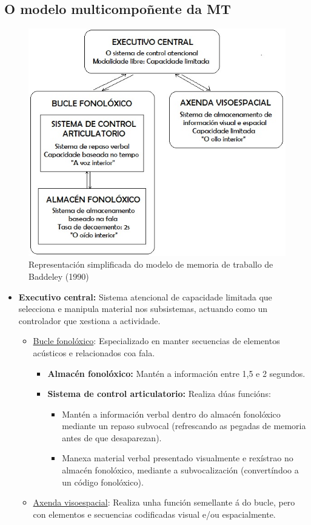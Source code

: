 \documentclass[a4paper,11pt]{article}
\begin{document}
\subsection{O modelo multicompoñente da MT}
\begin{figure}[h!]
	\centering
	\includegraphics[width=0.6\linewidth]{memoria2_4}
	\caption{Representación simplificada do modelo de memoria de traballo de Baddeley (1990)}
\end{figure}

\begin{itemize}
	\item \textbf{Executivo central:} Sistema atencional de capacidade limitada que selecciona e
	manipula material nos subsistemas, actuando como un controlador que xestiona a actividade.
	\begin{itemize}
		\item \underline{Bucle fonolóxico}: Especializado en manter secuencias de elementos acústicos
		e relacionados coa fala.
		\begin{itemize}
			\item \textbf{Almacén fonolóxico:} Mantén a información entre 1,5 e 2 segundos.
			\item \textbf{Sistema de control articulatorio:} Realiza dúas funcións:
			\begin{itemize}
				\item Mantén a información verbal dentro do almacén fonolóxico mediante un repaso
				subvocal (refrescando as pegadas de memoria antes de que desaparezan).
				\item Manexa material verbal presentado visualmente e rexístrao no almacén
				fonolóxico, mediante a subvocalización (convertíndoo a un código fonolóxico).
			\end{itemize}
		\end{itemize}
		\item \underline{Axenda visoespacial}: Realiza unha función semellante á do bucle, pero con
		elementos e secuencias codificadas visual e/ou espacialmente. 
	\end{itemize}
\end{itemize}
\end{document}
